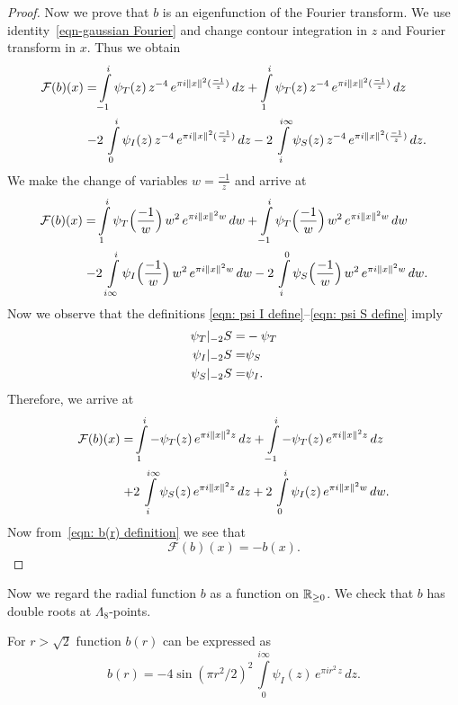 \begin{proof}
Now we prove that $b$ is an eigenfunction of the Fourier transform. We use identity~\eqref{eqn-gaussian Fourier} and change contour integration in $z$ and Fourier transform in $x$. Thus we obtain
\begin{align}
  \mathcal{F}(b)(x)= & \int\limits_{-1}^{i}\psi_T(z)\,z^{-4}\,e^{\pi i \|x\|^2 (\frac{-1}{z})}\,dz
    + \int\limits_{1}^{i}\psi_T(z)\,z^{-4}\,e^{\pi i \|x\|^2 (\frac{-1}{z})}\,dz \notag \\
  -& 2\,\int\limits_{0}^{i}\psi_I(z)\,z^{-4}\,e^{\pi i \|x\|^2 (\frac{-1}{z})}\,dz
  - 2\,\int\limits_{i}^{i\infty}\psi_S(z)\,z^{-4}\,e^{\pi i \|x\|^2 (\frac{-1}{z})}\,dz. \notag
\end{align}
We make the change of variables $w=\frac{-1}{z}$ and arrive at
\begin{align}
  \mathcal{F}(b)(x)= & \int\limits_{1}^{i}\psi_T\Big(\frac{-1}{w}\Big)\,w^{2}\,e^{\pi i \|x\|^2 w}\,dw
    + \int\limits_{-1}^{i}\psi_T\Big(\frac{-1}{w}\Big)\,w^{2}\,e^{\pi i \|x\|^2 w}\,dw \notag \\
  -& 2\,\int\limits_{i\infty}^{i}\psi_I\Big(\frac{-1}{w}\Big)\,w^{2}\,e^{\pi i \|x\|^2 w}\,dw
  - 2\,\int\limits_{i}^{0}\psi_S\Big(\frac{-1}{w}\Big)\,w^{2}\,e^{\pi i \|x\|^2 w}\,dw.\notag
\end{align}
Now we observe that the definitions \eqref{eqn: psi I define}--\eqref{eqn: psi S define}   imply
\begin{align}\psi_T|_{-2}S=&-\psi_T \notag \\
\psi_I|_{-2}S=&\psi_S \notag \\
\psi_S|_{-2}S=&\psi_I. \notag
\end{align}
Therefore, we arrive at
\begin{align}
  \mathcal{F}(b)(x)= & \int\limits_{1}^{i}-\psi_T(z)\,e^{\pi i \|x\|^2 z}\,dz
    + \int\limits_{-1}^{i}-\psi_T(z)\,e^{\pi i \|x\|^2 z}\,dz \notag \\
  +& 2\,\int\limits_{i}^{i\infty}\psi_S(z)\,e^{\pi i \|x\|^2 z}\,dz
  + 2\,\int\limits_{0}^{i}\psi_I(z)\,e^{\pi i \|x\|^2 w}\,dw.\notag
\end{align}
Now from~\eqref{eqn: b(r) definition} we see that
$$ \mathcal{F}(b)(x)=-b(x). $$
\end{proof}
Now we regard the radial function  $b$ as a function on $\mathbb{R}_{\geq0}$. We check that $b$ has double roots at $\Lambda_8$-points.
\begin{proposition}\label{prop: b(r) double zeroes}
For $r>\sqrt{2}$ function $b(r)$ can be expressed as
\begin{equation}\label{eqn: b double zeroes}
  b(r)=-4\sin(\pi r^2/2)^2\,\int\limits_{0}^{i\infty}\psi_I(z)\,e^{\pi i r^2 \,z}\,dz.
\end{equation}
\end{proposition}
